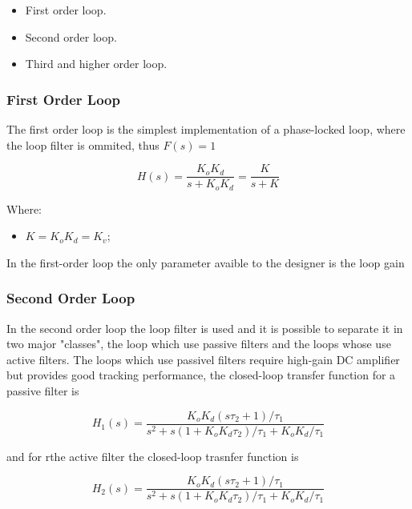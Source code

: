 \begin{itemize}
    \item First order loop.
    \item Second order loop.
    \item Third and higher order loop.
\end{itemize}

\subsubsection{First Order Loop}

The first order loop is the simplest implementation of a phase-locked loop,
where the loop filter is ommited, thus $F(s)=1$

\begin{equation}
    H(s)= \frac{K_oK_d}{s + K_oK_d}=
    \frac{K}{s + K}
    \label{eq:tf1st}
\end{equation}

Where:
\begin{itemize}
    \item $K = K_oK_d =K_v$;
\end{itemize}

In the first-order loop the only parameter avaible to the designer is the loop
gain

\subsubsection{Second Order Loop}

In the second order loop the loop filter is used and it is possible to separate
it in two major "classes", the loop which use passive filters and the loops
whose use active filters. The loops which use passivel filters require high-gain
DC amplifier but provides good tracking performance, the closed-loop transfer
function for a passive filter is

\begin{equation}
    H_1(s)=\frac{K_oK_d(s\tau_2+1)/\tau_1}
    {s^2+s(1+K_oK_d\tau_2)/\tau_1+K_oK_d/\tau_1}
    \label{eq:tf2ndpass}
\end{equation}

and for rthe active filter the closed-loop trasnfer function is

\begin{equation}
    H_2(s)= \frac{K_oK_d(s\tau_2+1)/\tau_1}
    {s^2+s(1+K_oK_d\tau_2)/\tau_1+K_oK_d/\tau_1}
    \label{eq:tf2ndact}
\end{equation}

